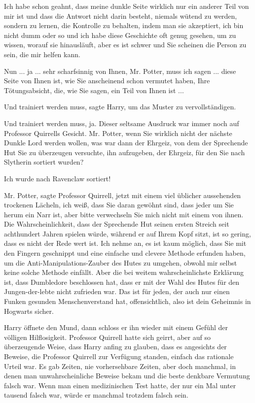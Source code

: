 \glqq{}Ich habe schon geahnt, dass meine dunkle Seite wirklich nur ein anderer
Teil von mir ist und dass die Antwort nicht darin besteht, niemals wütend zu
werden, sondern zu lernen, die Kontrolle zu behalten, indem man sie akzeptiert,
ich bin nicht dumm oder so und ich habe diese Geschichte oft genug gesehen, um
zu wissen, worauf sie hinausläuft, aber es ist schwer und Sie scheinen die
Person zu sein, die mir helfen kann.\grqq{}

\glqq{}Nun ... ja ... sehr scharfsinnig von Ihnen, Mr. Potter, muss ich sagen ...
diese Seite von Ihnen ist, wie Sie anscheinend schon vermutet haben, Ihre
Tötungsabsicht, die, wie Sie sagen, ein Teil von Ihnen ist ...\grqq{}

\glqq{}Und trainiert werden muss\grqq{}, sagte Harry, um das Muster zu
vervollständigen.

\glqq{}Und trainiert werden muss, ja.\grqq{} Dieser seltsame Ausdruck war immer
noch auf Professor Quirrells Gesicht. \glqq{}Mr. Potter, wenn Sie wirklich nicht
der nächste Dunkle Lord werden wollen, was war dann der Ehrgeiz, von dem der
Sprechende Hut Sie zu überzeugen versuchte, ihn aufzugeben, der Ehrgeiz, für den
Sie nach Slytherin sortiert wurden?\grqq{}

\glqq{}Ich wurde nach Ravenclaw sortiert!\grqq{}

\glqq{}Mr. Potter\grqq{}, sagte Professor Quirrell, jetzt mit einem viel üblicher
aussehenden trockenen Lächeln, \glqq{}ich weiß, dass Sie daran gewöhnt sind, dass
jeder um Sie herum ein Narr ist, aber bitte verwechseln Sie mich nicht mit einem
von ihnen. Die Wahrscheinlichkeit, dass der Sprechende Hut seinen ersten Streich
seit achthundert Jahren spielen würde, während er auf Ihrem Kopf sitzt, ist so
gering, dass es nicht der Rede wert ist. Ich nehme an, es ist kaum möglich, dass
Sie mit den Fingern geschnippt und eine einfache und clevere Methode erfunden
haben, um die Anti-Manipulations-Zauber des Hutes zu umgehen, obwohl mir selbst
keine solche Methode einfällt. Aber die bei weitem wahrscheinlichste Erklärung
ist, dass Dumbledore beschlossen hat, dass er mit der Wahl des Hutes für den
Jungen-der-lebte nicht zufrieden war. Das ist für jeden, der auch nur einen
Funken gesunden Menschenverstand hat, offensichtlich, also ist dein Geheimnis in
Hogwarts sicher.\grqq{}

Harry öffnete den Mund, dann schloss er ihn wieder mit einem Gefühl der völligen
Hilflosigkeit. Professor Quirrell hatte sich geirrt, aber auf so überzeugende
Weise, dass Harry anfing zu glauben, dass es angesichts der Beweise, die
Professor Quirrell zur Verfügung standen, einfach das rationale Urteil war. Es
gab Zeiten, nie vorhersehbare Zeiten, aber doch manchmal, in denen man
unwahrscheinliche Beweise bekam und die beste denkbare Vermutung falsch war.
Wenn man einen medizinischen Test hatte, der nur ein Mal unter tausend falsch
war, würde er manchmal trotzdem falsch sein.

